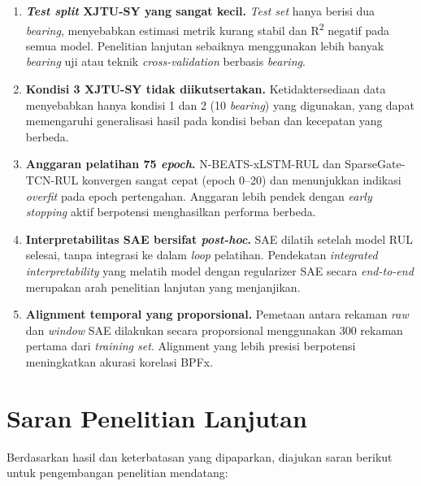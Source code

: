 \begin{enumerate}
  \item \textbf{\emph{Test split} XJTU-SY yang sangat kecil.}
        \emph{Test set} hanya berisi dua \emph{bearing}, menyebabkan estimasi metrik
        kurang stabil dan R\textsuperscript{2} negatif pada semua model.
        Penelitian lanjutan sebaiknya menggunakan lebih banyak \emph{bearing} uji
        atau teknik \emph{cross-validation} berbasis \emph{bearing}.

  \item \textbf{Kondisi 3 XJTU-SY tidak diikutsertakan.}
        Ketidaktersediaan data menyebabkan hanya kondisi 1 dan 2 (10 \emph{bearing})
        yang digunakan, yang dapat memengaruhi generalisasi hasil pada kondisi
        beban dan kecepatan yang berbeda.

  \item \textbf{Anggaran pelatihan 75 \emph{epoch}.}
        N-BEATS-xLSTM-RUL dan SparseGate-TCN-RUL konvergen sangat cepat
        (epoch 0--20) dan menunjukkan indikasi \emph{overfit} pada epoch
        pertengahan. Anggaran lebih pendek dengan \emph{early stopping} aktif
        berpotensi menghasilkan performa berbeda.

  \item \textbf{Interpretabilitas SAE bersifat \emph{post-hoc}.}
        SAE dilatih setelah model RUL selesai, tanpa integrasi ke dalam
        \emph{loop} pelatihan. Pendekatan \emph{integrated interpretability}
        yang melatih model dengan regularizer SAE secara \emph{end-to-end}
        merupakan arah penelitian lanjutan yang menjanjikan.

  \item \textbf{Alignment temporal yang proporsional.}
        Pemetaan antara rekaman \emph{raw} dan \emph{window} SAE dilakukan
        secara proporsional menggunakan 300 rekaman pertama dari
        \emph{training set}. Alignment yang lebih presisi berpotensi
        meningkatkan akurasi korelasi BPFx.
\end{enumerate}

\section{Saran Penelitian Lanjutan}
\label{sec:bab5_saran}

Berdasarkan hasil dan keterbatasan yang dipaparkan, diajukan saran
berikut untuk pengembangan penelitian mendatang:

